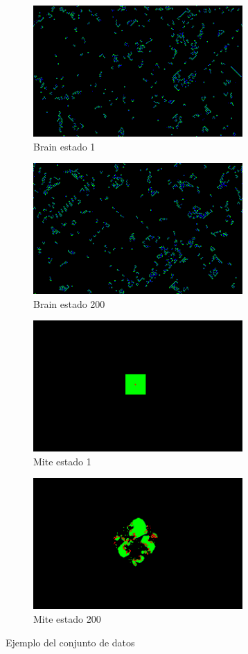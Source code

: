 \begin{figure}[h]
	
	\begin{subfigure}{0.5\textwidth}
		\includegraphics[width=0.9\linewidth, height=5cm]{fig/brain_1} 
		\caption{Brain estado 1}
		\label{fig:brain1}
	\end{subfigure}
	\begin{subfigure}{0.5\textwidth}
		\includegraphics[width=0.9\linewidth, height=5cm]{fig/brain_200}
		\caption{Brain estado 200}
		\label{fig:brain200}
	\end{subfigure}
	\begin{subfigure}{0.5\textwidth}
		\includegraphics[width=0.9\linewidth, height=5cm]{fig/mite_1}
		\caption{Mite estado 1}
		\label{fig:mite100}
	\end{subfigure}
	\begin{subfigure}{0.5\textwidth}
		\includegraphics[width=0.9\linewidth, height=5cm]{fig/mite_200}
		\caption{Mite estado 200}
		\label{fig:mite200}
	\end{subfigure}
	
	\caption{Ejemplo del conjunto de datos}
	\label{fig:caexamples}
\end{figure}

